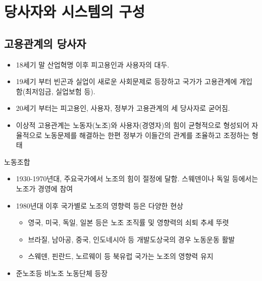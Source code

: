 \documentclass[aspectratio=169,xcolor=dvipsnames,handout]{beamer}
\begin{document}
\section{당사자와 시스템의 구성}

\subsection{고용관계의 당사자}
\begin{frame}
    \begin{itemize}
        \item 18세기 말 산업혁명 이후 피고용인과 사용자의 대두.
        \item 19세기 부터 빈곤과 실업이 새로운 사회문제로 등장하고 국가가 고용관계에 개입함(최저임금, 실업보험 등). 
        \item 20세기 부터는 피고용인, 사용자, 정부가 고용관계의 세 당사자로 굳어짐.
        \item 이상적 고용관계는 노동자(노조)와 사용자(경영자)의 힘이 균형적으로 형성되어  자율적으로 노동문제를  해결하는 한편 정부가 이들간의 관계를 조율하고 조정하는 형태
    \end{itemize}
\end{frame}

\begin{frame}{노동조합}
    \begin{itemize}
        \item 1930-1970년대, 주요국가에서 노조의 힘이 절정에 달함. 스웨덴이나 독일 등에서는 노조가 경영에 참여
        \item 1980년대 이후 국가별로 노조의 영향력 등은 다양한 현상
        \begin{itemize}
            \item 영국, 미국, 독일, 일본 등은 노조 조직률 및 영향력의 쇠퇴 추세 뚜렷
            \item 브라질, 남아공, 중국, 인도네시아 등 개발도상국의 경우 노동운동 활발
            \item 스웨덴, 핀란드, 노르웨이 등 북유럽 국가는 노조의 영향력 유지
        \end{itemize}
        \item 준노조등 비노조 노동단체 등장
    \end{itemize}
\end{frame}
\end{document}
